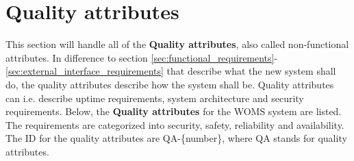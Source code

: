 \section{Quality attributes} 
\label{sec:quality_attributes}

This section will handle all of the \textbf{Quality attributes}, also called non-functional attributes.  In difference to section \ref{sec:functional_requirements}-\ref{sec:external_interface_requirements} that describe what the new system shall do, the quality attributes describe how the system shall be. \cite{idi.ntnu}  Quality attributes can i.e. describe uptime requirements, system architecture and security requirements.
Below, the \textbf{Quality attributes} for the WOMS system are listed. The requirements are categorized into security, safety, reliability and availability. The ID for the quality attributes are QA-\{number\}, where QA stands for quality attributes.

